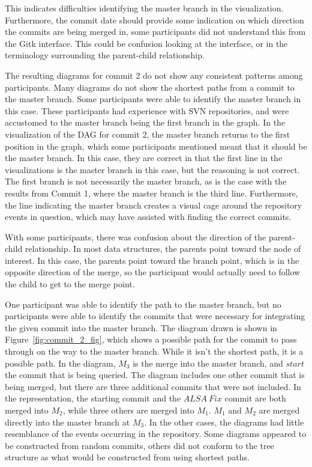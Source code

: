 This indicates difficulties identifying the master branch in the
visualization. Furthermore, the commit date should provide some
indication on which direction the commits are being merged in, some
participants did not understand this from the Gitk interface. This could
be confusion looking at the interface, or in the terminology surrounding
the parent-child relationship.

The resulting diagrams for commit 2 do not show any consistent patterns
among participants. Many diagrams do not show the shortest paths from a
commit to the master branch. Some participants were able to identify the
master branch in this case. These participants had experience with SVN
repositories, and were accustomed to the master branch being the first
branch in the graph. In the visualization of the DAG for commit 2, the
master branch returns to the first position in the graph, which some
participants mentioned meant that it should be the master branch. In
this case, they are correct in that the first line in the visualizations
is the master branch in this case, but the reasoning is not correct. The
first branch is not necessarily the master branch, as is the case with
the results from Commit 1, where the master branch is the third line.
Furthermore, the line indicating the master branch creates a visual cage
around the repository events in question, which may have assisted with
finding the correct commits.


With some participants, there was confusion about the direction of the
parent-child relationship. In most data structures, the parents point
toward the node of interest. In this case, the parents point toward the
branch point, which is in the opposite direction of the merge, so the
participant would actually need to follow the child to get to the merge
point.

One participant was able to identify the path to the master branch, but
no participants were able to identify the commits that were necessary
for integrating the given commit into the master branch. The diagram
drawn is shown in Figure~\ref{fig:commit_2_fig}, which shows a possible
path for the commit to pass through on the way to the master branch.
While it isn't the shortest path, it is a possible path. In the diagram,
$M_3$ is the merge into the master branch, and $start$ the commit that
is being queried. The diagram includes one other commit that is being
merged, but there are three additional commits that were not included.
In the \mt{} representation, the starting commit and the $ALSA\ Fix$
commit are both merged into $M_2$, while three others are merged into
$M_1$. $M_1$ and $M_2$ are merged directly into the master branch at
$M_3$. In the other cases, the diagrams had little resemblance of the
events occurring in the repository. Some diagrams appeared to be
constructed from random commits, others did not conform to the tree
structure as what would be constructed from using shortest paths.


